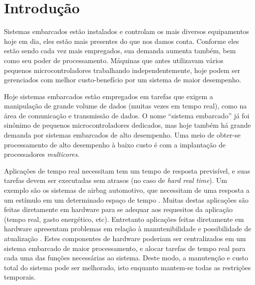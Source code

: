 \chapter{Introdução}


Sistemas embarcados estão instalados e controlam os mais diversos equipamentos hoje em dia, eles estão mais presentes do que nos damos conta. Conforme eles estão sendo cada vez mais empregados, sua demanda aumenta também, bem como seu poder de processamento. Máquinas que antes utilizavam vários pequenos microcontroladores trabalhando independentemente, hoje podem ser gerenciados com melhor custo-benefício por um sistema de maior desempenho.%


Hoje sistemas embarcados estão empregados em tarefas que exigem a manipulação de grande volume de dados (muitas vezes em tempo real), como na área de comunicação e transmissão de dados. O nome ``sistema embarcado'' já foi sinônimo de pequenos microcontroladores dedicados, mas hoje também há grande demanda por sistemas embarcados de alto desempenho. Uma meio de obter-se processamento de alto desempenho à baixo custo é com a implantação de processadores \emph{multicores}.

Aplicações de tempo real necessitam tem um tempo de resposta previsível, e suas tarefas devem ser executadas sem atrasos (no caso de \emph{hard real time}). Um exemplo são os sistemas de airbag automotivo, que necessitam de uma resposta a um estímulo em um determinado espaço de tempo \cite{nat}. Muitas destas aplicações são feitas diretamente em hardware para se adequar aos requesitos da aplicação (tempo real, gasto energético, etc). Entretanto aplicações feitas diretamente em hardware apresentam problemas em relação à manutenibilidade e possibilidade de atualização \cite{gio}. Estes componentes de hardware poderiam ser centralizados em um sistema embarcado de maior processamento, e alocar tarefas de tempo real para cada uma das funções necessárias ao sistema. Deste modo, a manutenção e custo total do sistema pode ser melhorado, isto enquanto mantem-se todas as restrições temporais.

